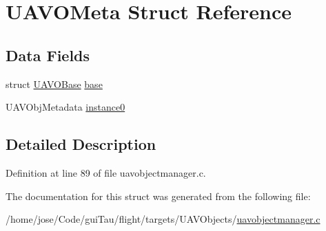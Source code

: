 \hypertarget{struct_u_a_v_o_meta}{\section{U\-A\-V\-O\-Meta Struct Reference}
\label{struct_u_a_v_o_meta}
}
\subsection*{Data Fields}
\begin{DoxyCompactItemize}
\item 
struct \hyperlink{struct_u_a_v_o_base}{U\-A\-V\-O\-Base} \hyperlink{group___u_a_v_gadaee40988f6887dd12b46918c829466e}{base}
\item 
U\-A\-V\-Obj\-Metadata \hyperlink{group___u_a_v_gae6be2c703c11bc6bb66109a55dd84d9e}{instance0}
\end{DoxyCompactItemize}


\subsection{Detailed Description}


Definition at line 89 of file uavobjectmanager.\-c.



The documentation for this struct was generated from the following file\-:\begin{DoxyCompactItemize}
\item 
/home/jose/\-Code/gui\-Tau/flight/targets/\-U\-A\-V\-Objects/\hyperlink{uavobjectmanager_8c}{uavobjectmanager.\-c}\end{DoxyCompactItemize}
